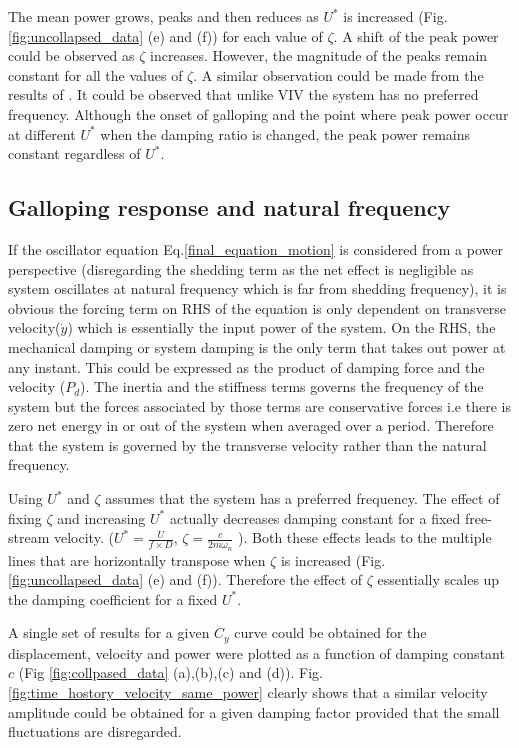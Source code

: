  The mean power grows, peaks and then reduces as $U^*$ is increased (Fig.\ref{fig:uncollapsed_data} (e) and (f)) for each value of $\zeta$. A shift of the peak power could be observed as $\zeta$ increases. However, the magnitude of the peaks remain constant for all the values of $\zeta$. A similar observation could be made from the results of \cite{Barrero-Gil2010a}. It could be observed that unlike VIV the  system has no preferred frequency. Although the onset of galloping and the point where peak power occur at different $U^*$ when the damping ratio is changed, the peak power remains constant regardless of $U^*$.
 
 \subsection{Galloping response and natural frequency}
 
 If the oscillator equation Eq.\eqref{final_equation_motion} is considered from a power perspective (disregarding the shedding term as the net effect is negligible as system oscillates at natural frequency which is far from shedding frequency), it is obvious the forcing term on RHS of the equation is only dependent on transverse velocity($\dot{y}$) which is essentially the input power of the system. On the RHS, the mechanical damping or system damping is the only term that takes out power at any instant. This could be expressed as the product of damping force and the velocity ($P_d$). The inertia and the stiffness terms governs the frequency of the system but the forces associated by those terms are conservative forces i.e there is zero net energy in or out of the system when averaged over a period. Therefore that the system is governed by the transverse velocity rather than the natural frequency.
 

 Using $U^*$ and $\zeta$ assumes that the system has a preferred frequency. The effect of fixing $\zeta$ and increasing $U^*$ actually decreases damping constant for a fixed free-stream velocity. ($U^*=\frac{U}{f \times D}$, $\zeta= \frac{c}{2 m \omega_n}$ ). Both these effects leads to the multiple lines that are horizontally transpose when $\zeta$ is increased (Fig.\ref{fig:uncollapsed_data} (e) and (f)). Therefore the effect of $\zeta$ essentially scales up the damping coefficient for a fixed $U^*$.
 
 A single set of results for a given $C_y$ curve could be obtained for the displacement, velocity and power were plotted as a function of damping constant $c$ 
(Fig \ref{fig:collpased_data} (a),(b),(c) and (d)). Fig.\ref{fig:time_hostory_velocity_same_power} clearly shows that a similar velocity amplitude could be obtained for a given damping factor provided that the small fluctuations are disregarded. 
 

